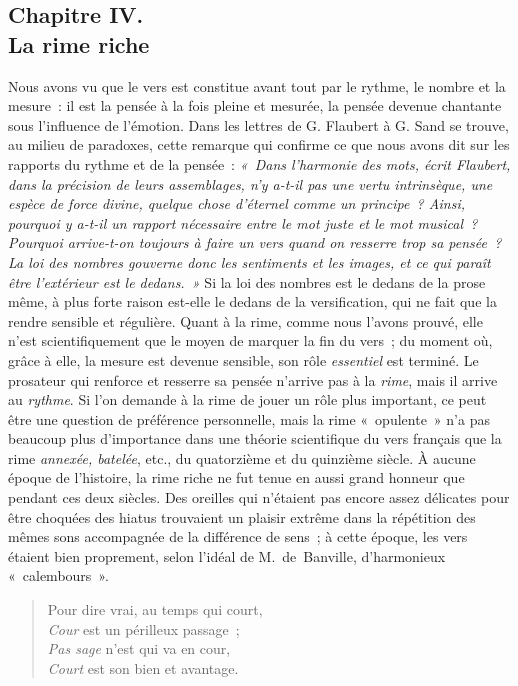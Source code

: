 \documentclass[french,twoside]{book} %
\begin{document}
\subsection[{Chapitre IV. La rime riche}]{Chapitre IV. \\
La rime riche}
\noindent  Nous avons vu que le vers est constitue avant tout par le rythme, le nombre et la mesure : il est la pensée à la fois pleine et mesurée, la pensée devenue chantante sous l’influence de l’émotion. Dans les lettres de G. Flaubert à G. Sand se trouve, au milieu de paradoxes, cette remarque qui confirme ce que nous avons dit sur les rapports du rythme et de la pensée : \emph{« Dans l’harmonie des mots, écrit Flaubert, dans la précision de leurs assemblages, n’y a-t-il pas une vertu intrinsèque, une espèce de force divine, quelque chose d’éternel comme un principe ? Ainsi, pourquoi y a-t-il un rapport nécessaire entre le mot juste et le mot musical ? \emph{Pourquoi arrive-t-on toujours à faire un vers quand on resserre trop sa pensée} ? La loi des \emph{nombres} gouverne donc les sentiments et les images, et ce qui paraît être l’extérieur est le dedans. »} Si la loi des nombres est le dedans de la prose même, à plus forte raison est-elle le dedans de la versification, qui ne fait que la rendre sensible et régulière. Quant à la rime, comme nous l’avons prouvé,  elle n’est scientifiquement que le moyen de marquer la fin du vers ; du moment où, grâce à elle, la mesure est devenue sensible, son rôle \emph{essentiel} est terminé. Le prosateur qui renforce et resserre sa pensée n’arrive pas à la \emph{rime}, mais il arrive au \emph{rythme}. Si l’on demande à la rime de jouer un rôle plus important, ce peut être une question de préférence personnelle, mais la rime « opulente » n’a pas beaucoup plus d’importance dans une théorie scientifique du vers français que la rime \emph{annexée, batelée}, etc., du quatorzième et du quinzième siècle. À aucune époque de l’histoire, la rime riche ne fut tenue en aussi grand honneur que pendant ces deux siècles. Des oreilles qui n’étaient pas encore assez délicates pour être choquées des hiatus trouvaient un plaisir extrême dans la répétition des mêmes sons accompagnée de la différence de sens ; à cette époque, les vers étaient bien proprement, selon l’idéal de M. de Banville, d’harmonieux « calembours ».\par


\begin{verse}
Pour dire vrai, au temps qui court,\\
\emph{Cour} est un périlleux passage ;\\
\emph{Pas sage} n’est qui va en cour,\\
\emph{Court} est son bien et avantage.\\
\end{verse}
\end{document}
